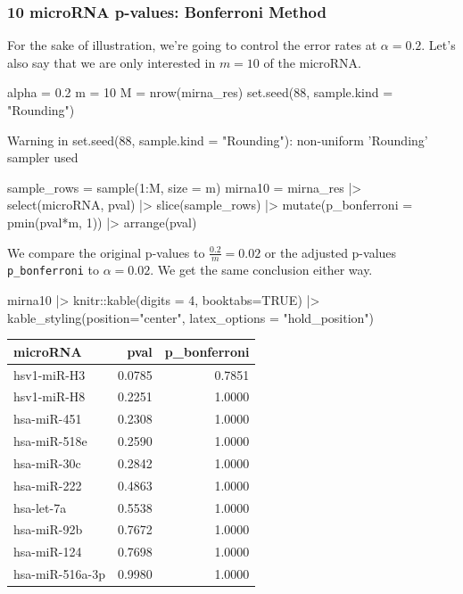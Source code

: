 \documentclass[a4paper]{article}
\begin{document}
\subsubsection{10 microRNA p-values: Bonferroni Method}
For the sake of illustration, we're going to control the error rates at \( \alpha = 0.2 \). Let's also say that we are only interested in \( m = 10 \) of the microRNA.
\begin{Schunk}
\begin{Sinput}
alpha = 0.2
m = 10
M = nrow(mirna_res)
set.seed(88, sample.kind = "Rounding")
\end{Sinput}
\begin{Soutput}
Warning in set.seed(88, sample.kind = "Rounding"): non-uniform 'Rounding' sampler used
\end{Soutput}
\begin{Sinput}
sample_rows = sample(1:M, size = m)
mirna10 = mirna_res |> 
  select(microRNA, pval) |> 
  slice(sample_rows) |> 
  mutate(p_bonferroni = pmin(pval*m, 1)) |> 
  arrange(pval)
\end{Sinput}
\end{Schunk}
We compare the original p-values to \( \frac{0.2}{m} = 0.02 \) or the adjusted p-values \lstinline|p_bonferroni| to \( \alpha = 0.02 \). We get the same conclusion either way.
\begin{Schunk}
\begin{Sinput}
mirna10 |> 
  knitr::kable(digits = 4, booktabs=TRUE) |>
    kable_styling(position="center", latex_options = "hold_position")
\end{Sinput}
\begin{table}[!h]
\centering
\begin{tabular}{lrr}
\toprule
microRNA & pval & p\_bonferroni\\
\midrule
hsv1-miR-H3 & 0.0785 & 0.7851\\
hsv1-miR-H8 & 0.2251 & 1.0000\\
hsa-miR-451 & 0.2308 & 1.0000\\
hsa-miR-518e & 0.2590 & 1.0000\\
hsa-miR-30c & 0.2842 & 1.0000\\
\addlinespace
hsa-miR-222 & 0.4863 & 1.0000\\
hsa-let-7a & 0.5538 & 1.0000\\
hsa-miR-92b & 0.7672 & 1.0000\\
hsa-miR-124 & 0.7698 & 1.0000\\
hsa-miR-516a-3p & 0.9980 & 1.0000\\
\bottomrule
\end{tabular}
\end{table}

\end{Schunk}
\end{document}
